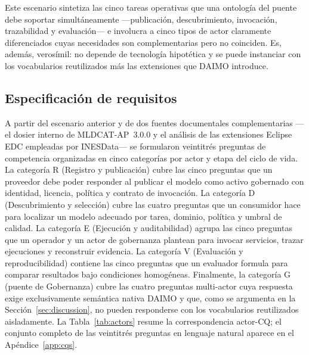 \documentclass[11pt,a4paper]{article}
\begin{document}
Este escenario sintetiza las cinco tareas operativas que una ontología del puente debe soportar simultáneamente ---publicación, descubrimiento, invocación, trazabilidad y evaluación--- e involucra a cinco tipos de actor claramente diferenciados cuyas necesidades son complementarias pero no coinciden. Es, además, verosímil: no depende de tecnología hipotética y se puede instanciar con los vocabularios reutilizados más las extensiones que DAIMO introduce.

\subsection{Especificación de requisitos}\label{sec:method-req}

A partir del escenario anterior y de dos fuentes documentales complementarias ---el dosier interno de MLDCAT-AP~3.0.0 y el análisis de las extensiones Eclipse EDC empleadas por INESData--- se formularon veintitrés preguntas de competencia organizadas en cinco categorías por actor y etapa del ciclo de vida. La categoría R (Registro y publicación) cubre las cinco preguntas que un proveedor debe poder responder al publicar el modelo como activo gobernado con identidad, licencia, política y contrato de invocación. La categoría D (Descubrimiento y selección) cubre las cuatro preguntas que un consumidor hace para localizar un modelo adecuado por tarea, dominio, política y umbral de calidad. La categoría E (Ejecución y auditabilidad) agrupa las cinco preguntas que un operador y un actor de gobernanza plantean para invocar servicios, trazar ejecuciones y reconstruir evidencia. La categoría V (Evaluación y reproducibilidad) contiene las cinco preguntas que un evaluador formula para comparar resultados bajo condiciones homogéneas. Finalmente, la categoría G (puente de Gobernanza) cubre las cuatro preguntas multi-actor cuya respuesta exige exclusivamente semántica nativa DAIMO y que, como se argumenta en la Sección~\ref{sec:discussion}, no pueden responderse con los vocabularios reutilizados aisladamente. La Tabla~\ref{tab:actors} resume la correspondencia actor-CQ; el conjunto completo de las veintitrés preguntas en lenguaje natural aparece en el Apéndice~\ref{app:cqs}.
\end{document}
